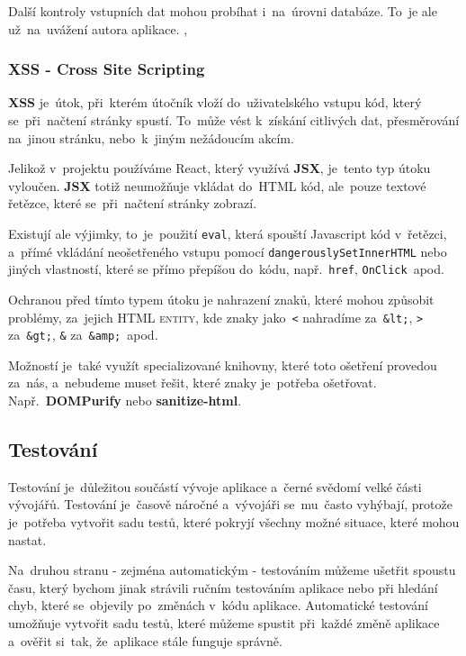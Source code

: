 \documentclass[14pt,a4paper]{article}
\begin{document}
            Další kontroly vstupních dat mohou probíhat i~na~úrovni databáze. To~je ale už~na~uvážení autora aplikace. \parencite{w3s:SQLInjection}, \parencite{itnetwork:SQLInjection}

            \subsubsection{XSS - Cross Site Scripting}
            \textbf{XSS} je~útok, při~kterém útočník vloží do~uživatelského vstupu kód, který se~při~načtení stránky spustí. To~může vést k~získání citlivých dat, přesměrování na~jinou stránku, nebo~k~jiným nežádoucím akcím.

            Jelikož v~projektu používáme React, který využívá \textbf{JSX}, je~tento typ útoku vyloučen. \textbf{JSX} totiž neumožňuje vkládat do~HTML kód, ale~pouze textové řetězce, které se~při~načtení stránky zobrazí.

            Existují ale výjimky, to~je~použití \texttt{eval}, která spouští Javascript kód v~řetězci, a~přímé vkládání neošetřeného vstupu pomocí \texttt{dangerouslySetInnerHTML} nebo jiných vlastností, které se přímo přepíšou do~kódu, např.~\texttt{href}, \texttt{OnClick}~apod.

            Ochranou před tímto typem útoku je nahrazení znaků, které mohou způsobit problémy, za~jejich \textsc{HTML entity}, kde znaky jako~\texttt{<} nahradíme za~\texttt{\&lt;}, \texttt{>} za~\texttt{\&gt;}, \texttt{\&} za~\texttt{\&amp;}~apod.
            
            Možností je~také využít specializované knihovny, které toto ošetření provedou za~nás, a~nebudeme muset řešit, které znaky je~potřeba ošetřovat. Např.~\textbf{DOMPurify} nebo \textbf{sanitize-html}. \parencite{w3s:XSS}

        \subsection{Testování}
        Testování je~důležitou součástí vývoje aplikace a~černé svědomí velké části vývojářů. Testování je~časově náročné a~vývojáři se~mu~často vyhýbají, protože je~potřeba vytvořit sadu testů, které pokryjí všechny možné situace, které mohou nastat.
        
        Na~druhou stranu - zejména automatickým - testováním můžeme ušetřit spoustu času, který bychom jinak strávili ručním testováním aplikace nebo při hledání chyb, které se~objevily po~změnách v~kódu aplikace. Automatické testování umožňuje vytvořit sadu testů, které můžeme spustit při~každé změně aplikace a~ověřit si~tak, že~aplikace stále funguje správně.
        
\end{document}
